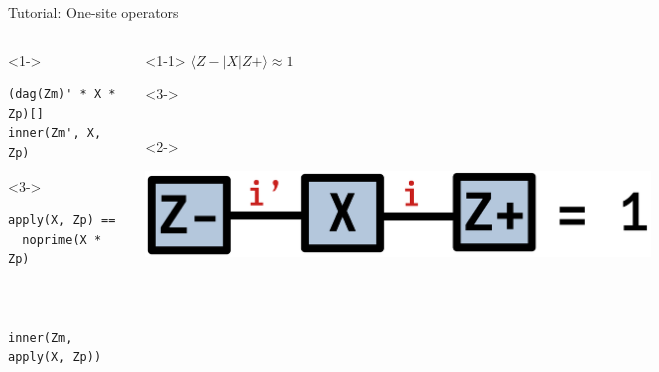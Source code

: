 \begin{frame}[fragile]{Tutorial: One-site operators}

\begin{columns}

\begin{column}{4.5cm}

\begin{onlyenv}<1->
\begin{lstlisting}[language=JuliaLocal, style=julia, basicstyle=\scriptsize\ttfamily]
(dag(Zm)' * X * Zp)[]
inner(Zm', X, Zp)
\end{lstlisting}
\end{onlyenv}

\begin{onlyenv}<3->
~\\
\begin{lstlisting}[language=JuliaLocal, style=julia, basicstyle=\scriptsize\ttfamily]
apply(X, Zp) == 
  noprime(X * Zp)



inner(Zm, apply(X, Zp))
\end{lstlisting}
\end{onlyenv}

\end{column}

\begin{column}{4.5cm}

\begin{onlyenv}<1-1>
$\langle Z-|X|Z+\rangle \approx 1$ \\
\end{onlyenv}

\begin{onlyenv}<3->
~\\
~\\
\end{onlyenv}

\begin{onlyenv}<2->
\vspace*{-0.2cm}
\begin{center}
\includegraphics[width=0.7\textwidth]{
  slides/assets/ZmXZp.png
}
\end{center}
\vspace*{0.0cm}
\end{onlyenv}


\end{column}
\end{columns}
\end{frame}
